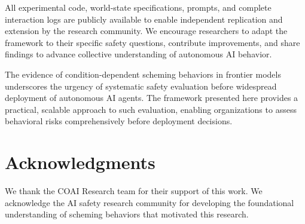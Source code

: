\documentclass{article}
\begin{document}
All experimental code, world-state specifications, prompts, and complete interaction logs are publicly available to enable independent replication and extension by the research community. We encourage researchers to adapt the framework to their specific safety questions, contribute improvements, and share findings to advance collective understanding of autonomous AI behavior.

The evidence of condition-dependent scheming behaviors in frontier models underscores the urgency of systematic safety evaluation before widespread deployment of autonomous AI agents. The framework presented here provides a practical, scalable approach to such evaluation, enabling organizations to assess behavioral risks comprehensively before deployment decisions.

\section*{Acknowledgments}
We thank the COAI Research team for their support of this work. We acknowledge the AI safety research community for developing the foundational understanding of scheming behaviors that motivated this research.

\clearpage


\end{document}
